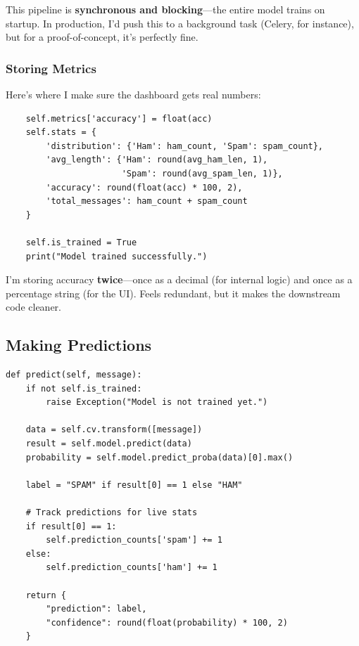 \documentclass[12pt, a4paper]{article}
\begin{document}
\begin{highlight}
    This pipeline is \textbf{synchronous and blocking}---the entire model trains on startup. In production, I'd push this to a background task (Celery, for instance), but for a proof-of-concept, it's perfectly fine.
\end{highlight}

\subsubsection{Storing Metrics}

Here's where I make sure the dashboard gets real numbers:

\begin{verbatim}
    self.metrics['accuracy'] = float(acc)
    self.stats = {
        'distribution': {'Ham': ham_count, 'Spam': spam_count},
        'avg_length': {'Ham': round(avg_ham_len, 1), 
                       'Spam': round(avg_spam_len, 1)},
        'accuracy': round(float(acc) * 100, 2),
        'total_messages': ham_count + spam_count
    }
    
    self.is_trained = True
    print("Model trained successfully.")
\end{verbatim}

\begin{techdetail}
    I'm storing accuracy \textbf{twice}---once as a decimal (for internal logic) and once as a percentage string (for the UI). Feels redundant, but it makes the downstream code cleaner.
\end{techdetail}

\subsection{Making Predictions}

\begin{verbatim}
def predict(self, message):
    if not self.is_trained:
        raise Exception("Model is not trained yet.")
    
    data = self.cv.transform([message])
    result = self.model.predict(data)
    probability = self.model.predict_proba(data)[0].max()
    
    label = "SPAM" if result[0] == 1 else "HAM"
    
    # Track predictions for live stats
    if result[0] == 1:
        self.prediction_counts['spam'] += 1
    else:
        self.prediction_counts['ham'] += 1
    
    return {
        "prediction": label,
        "confidence": round(float(probability) * 100, 2)
    }
\end{verbatim}
\end{document}
